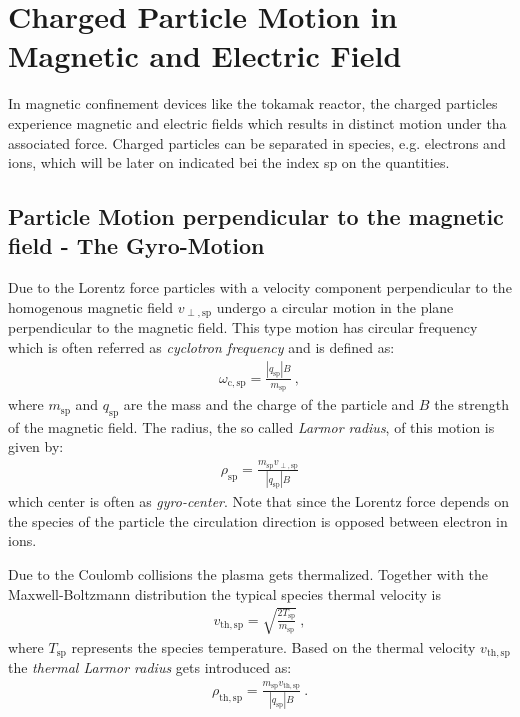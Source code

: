 \section{Charged Particle Motion in Magnetic and Electric Field}
\label{sec:motion}

In magnetic confinement devices like the tokamak reactor, the charged particles experience magnetic and electric fields which results in distinct motion under tha associated force. Charged particles can be separated in species, e.g. electrons and ions, which will be later on indicated bei the index sp on the quantities. 

\subsection{Particle Motion perpendicular to the magnetic field - The Gyro-Motion}
\label{sub:gyromotion}

Due to the Lorentz force particles with a velocity component perpendicular to the homogenous magnetic field $v_{\perp,\mathrm{sp}}$ undergo a circular motion in the plane perpendicular to the magnetic field. This type motion has circular frequency which is often referred as \textit{cyclotron frequency} and is defined as:
\begin{gather}
    \omega_\mathrm{c,sp} = \frac{|q_\mathrm{sp}|B}{m_\mathrm{sp}}~,
\end{gather}
where $m_\mathrm{sp}$ and $q_\mathrm{sp}$ are the mass and the charge of the particle and $B$ the strength of the magnetic field. The radius, the so called \textit{Larmor radius}, of this motion is given by:
\begin{gather}
    \rho_\mathrm{sp} = \frac{m_\mathrm{sp}v_{\perp,\mathrm{sp}}}{|q_\mathrm{sp}|B}
\end{gather}
which center is often as \textit{gyro-center}. Note that since the Lorentz force depends on the species of the particle the circulation direction is opposed between electron in ions. 

Due to the Coulomb collisions the plasma gets thermalized. Together with the Maxwell-Boltzmann distribution the typical species thermal velocity is
\begin{gather}
    v_\mathrm{th,sp} = \sqrt{\frac{2T_\mathrm{sp}}{m_\mathrm{sp}}}~,
\end{gather}
where $T_\mathrm{sp}$ represents the species temperature. Based on the thermal velocity $v_\mathrm{th,sp}$ the \textit{thermal Larmor radius} gets introduced as:
\begin{gather}
    \rho_\mathrm{th,sp} = \frac{m_\mathrm{sp}v_{\mathrm{th,sp}}}{|q_\mathrm{sp}|B}~.
\end{gather}

